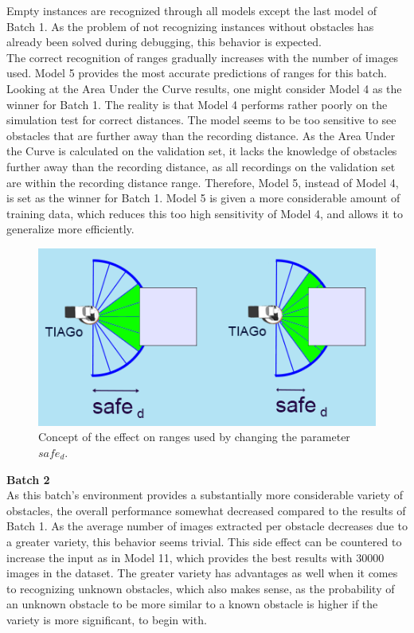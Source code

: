 Empty instances are recognized through all models except the last model of Batch 1. As the problem of not recognizing instances without obstacles has already been solved during debugging, this behavior is expected.\\

The correct recognition of ranges gradually increases with the number of images used. Model 5 provides the most accurate predictions of ranges for this batch.\\

Looking at the Area Under the Curve results, one might consider Model 4 as the winner for Batch 1. The reality is that Model 4 performs rather poorly on the simulation test for correct distances. The model seems to be too sensitive to see obstacles that are further away than the recording distance. As the Area Under the Curve is calculated on the validation set, it lacks the knowledge of obstacles further away than the recording distance, as all recordings on the validation set are within the recording distance range. Therefore, Model 5, instead of Model 4, is set as the winner for Batch 1. Model 5 is given a more considerable amount of training data, which reduces this too high sensitivity of Model 4, and allows it to generalize more efficiently.\\

\begin{figure}[H]%
\centering
\includegraphics[width=1\textwidth]{Bilder/safe_d.png} 
\caption[]{Concept of the effect on ranges used by changing the parameter $safe_{d}$.}
\label{safe_d_adjustment}
\end{figure}


\textbf{Batch 2}\\
As this batch's environment provides a substantially more considerable variety of obstacles, the overall performance somewhat decreased compared to the results of Batch 1. As the average number of images extracted per obstacle decreases due to a greater variety, this behavior seems trivial. This side effect can be countered to increase the input as in Model 11, which provides the best results with 30000 images in the dataset. The greater variety has advantages as well when it comes to recognizing unknown obstacles, which also makes sense, as the probability of an unknown obstacle to be more similar to a known obstacle is higher if the variety is more significant, to begin with.\\

